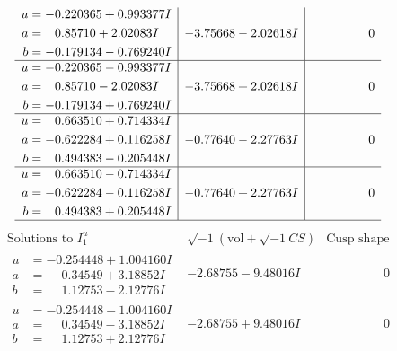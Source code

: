 \documentclass[1p]{elsarticle_modified}
\theoremstyle{definition}
\newcommand{\I}{\sqrt{-1}}
\begin{document}
$$\begin{array}{c|c|c}
\begin{aligned}
u &= -0.220365 + 0.993377 I \\
a &= \phantom{-}0.85710 + 2.02083 I \\
b &= -0.179134 - 0.769240 I\end{aligned}
 & -3.75668 - 2.02618 I & \phantom{-0.000000 } 0 \\ \hline\begin{aligned}
u &= -0.220365 - 0.993377 I \\
a &= \phantom{-}0.85710 - 2.02083 I \\
b &= -0.179134 + 0.769240 I\end{aligned}
 & -3.75668 + 2.02618 I & \phantom{-0.000000 } 0 \\ \hline\begin{aligned}
u &= \phantom{-}0.663510 + 0.714334 I \\
a &= -0.622284 + 0.116258 I \\
b &= \phantom{-}0.494383 - 0.205448 I\end{aligned}
 & -0.77640 - 2.27763 I & \phantom{-0.000000 } 0 \\ \hline\begin{aligned}
u &= \phantom{-}0.663510 - 0.714334 I \\
a &= -0.622284 - 0.116258 I \\
b &= \phantom{-}0.494383 + 0.205448 I\end{aligned}
 & -0.77640 + 2.27763 I & \phantom{-0.000000 } 0\\
 \hline 
 \end{array}$$\newpage$$\begin{array}{c|c|c}  
\text{Solutions to }I^u_{1}& \I (\text{vol} + \sqrt{-1}CS) & \text{Cusp shape}\\
 \hline 
\begin{aligned}
u &= -0.254448 + 1.004160 I \\
a &= \phantom{-}0.34549 + 3.18852 I \\
b &= \phantom{-}1.12753 - 2.12776 I\end{aligned}
 & -2.68755 - 9.48016 I & \phantom{-0.000000 } 0 \\ \hline\begin{aligned}
u &= -0.254448 - 1.004160 I \\
a &= \phantom{-}0.34549 - 3.18852 I \\
b &= \phantom{-}1.12753 + 2.12776 I\end{aligned}
 & -2.68755 + 9.48016 I & \phantom{-0.000000 } 0 \\ \hline\begin{aligned}

\end{aligned}
\end{array}$$
\end{document}
